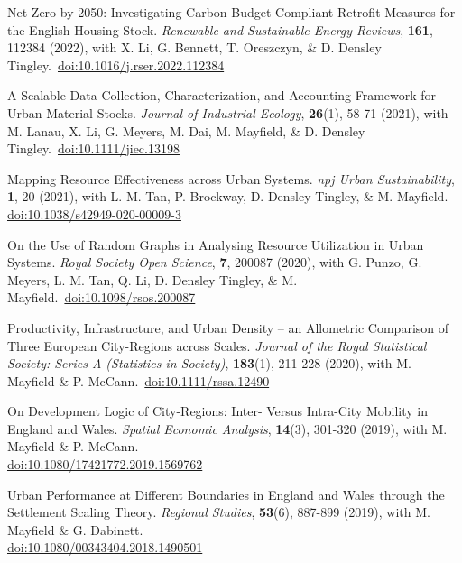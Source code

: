 \documentclass[10pt]{article}
\begin{document}
\begin{etaremune}[leftmargin=0ex, topsep=0ex]
	\item Net Zero by 2050: Investigating Carbon-Budget Compliant Retrofit Measures for the English Housing Stock. \emph{Renewable and Sustainable Energy Reviews}, \textbf{161}, 112384 (2022), with X. Li, G. Bennett, T. Oreszczyn, \& D. Densley Tingley.~\href{https://doi.org/10.1016/j.rser.2022.112384}{doi:10.1016/j.rser.2022.112384}

	\item A Scalable Data Collection, Characterization, and Accounting Framework for Urban Material Stocks. \emph{Journal of Industrial Ecology}, \textbf{26}(1), 58-71 (2021), with M. Lanau, X. Li, G. Meyers, M. Dai, M. Mayfield, \& D. Densley Tingley.~\href{http://dx.doi.org/10.1111/jiec.13198}{doi:10.1111/jiec.13198}
	
	\item Mapping Resource Effectiveness across Urban Systems. \emph{npj Urban Sustainability}, \textbf{1}, 20 (2021), with L. M. Tan, P. Brockway, D. Densley Tingley, \& M. Mayfield.~\\\href{http://dx.doi.org/10.1038/s42949-020-00009-3}{doi:10.1038/s42949-020-00009-3}

	\item On the Use of Random Graphs in Analysing Resource Utilization in Urban Systems. \emph{Royal Society Open Science}, \textbf{7}, 200087 (2020), with G. Punzo, G. Meyers, L. M. Tan, Q. Li, D. Densley Tingley, \& M. Mayfield.~\href{http://dx.doi.org/10.1098/rsos.200087}{doi:10.1098/rsos.200087}
	
	\item Productivity, Infrastructure, and Urban Density -- an Allometric Comparison of Three European City-Regions across Scales. \emph{Journal of the Royal Statistical Society: Series A (Statistics in Society)}, \textbf{183}(1), 211-228 (2020), with M. Mayfield \& P. McCann.~\href{https://doi.org/10.1111/rssa.12490}{doi:10.1111/rssa.12490}
		
	\item On Development Logic of City-Regions: Inter- Versus Intra-City Mobility in England and Wales. \emph{Spatial Economic Analysis}, \textbf{14}(3), 301-320 (2019), with M. Mayfield \& P. McCann.~\\\href{https://doi.org/10.1080/17421772.2019.1569762}{doi:10.1080/17421772.2019.1569762}
	
	\item Urban Performance at Different Boundaries in England and Wales through the Settlement Scaling Theory. \emph{Regional Studies}, \textbf{53}(6), 887-899 (2019), with M. Mayfield \& G. Dabinett.~\\\href{http://dx.doi.org/10.1080/00343404.2018.1490501}{doi:10.1080/00343404.2018.1490501}


\end{etaremune}
\end{document}
